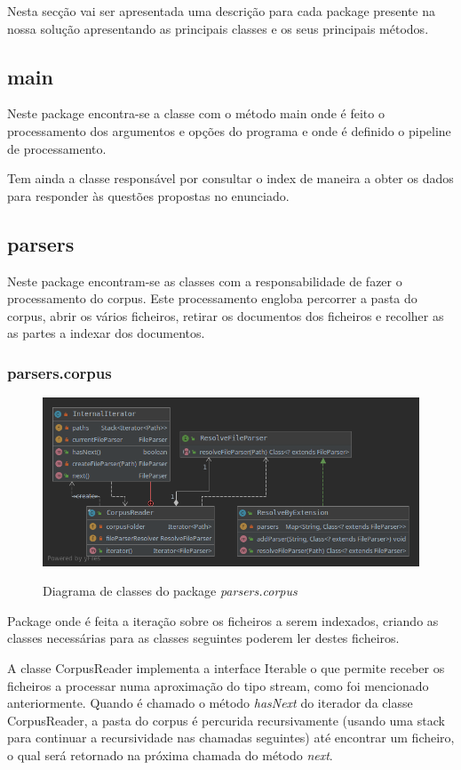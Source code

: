 \documentclass[12pt]{article}
\begin{document}
Nesta secção vai ser apresentada uma descrição para cada package presente na
nossa solução apresentando as principais classes e os seus principais métodos. 

\subsection{main}

Neste package encontra-se a classe com o método main onde é feito o
processamento dos argumentos e opções do programa e onde é definido o
pipeline de processamento.

Tem ainda a classe responsável por consultar o index de maneira a
obter os dados para responder às questões propostas no enunciado.

\subsection{parsers}
Neste package encontram-se as classes com a responsabilidade de fazer
o processamento do corpus. Este processamento engloba percorrer a pasta do
corpus, abrir os vários ficheiros, retirar os documentos dos ficheiros e
recolher as as partes a indexar dos documentos.

\subsubsection{parsers.corpus}
\begin{figure}[h]
  \center
  \includegraphics[width=12cm]{packages_parsers_corpus.png}
  \label{fig:packages_parsers_corpus}
  \caption{Diagrama de classes do package \it parsers.corpus}
\end{figure}

Package onde é feita a iteração sobre os ficheiros a serem indexados, criando as classes
necessárias para as classes seguintes poderem ler destes ficheiros.

A classe CorpusReader implementa a interface Iterable o que permite receber os ficheiros
a processar numa aproximação do tipo stream, como foi mencionado anteriormente. Quando
é chamado o método {\it hasNext} do iterador da classe CorpusReader, a pasta do corpus
é percurida recursivamente (usando uma stack para continuar a recursividade nas chamadas
seguintes) até encontrar um ficheiro, o qual será retornado na próxima chamada do método
{\it next}.
\end{document}
